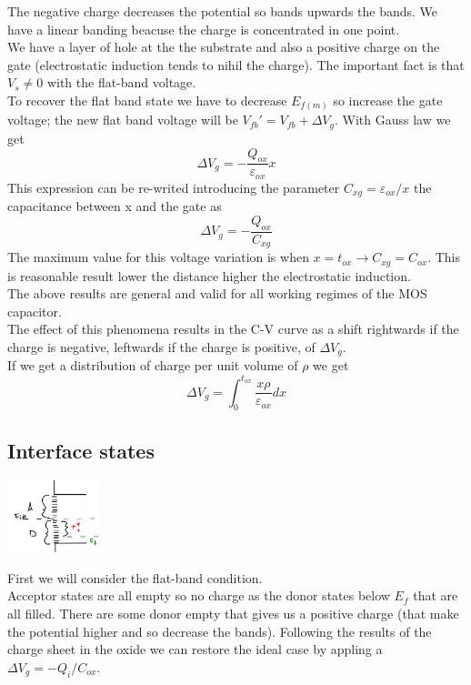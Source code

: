 The negative charge decreases the potential so bands upwards the bands. We have a linear banding beacuse the charge is concentrated in one point.\\
We have a layer of hole at the the substrate and also a positive charge on the gate (electrostatic induction tends to nihil the charge). The important fact is that $V_s\neq0$ with the flat-band voltage.\\
To recover the flat band state we have to decrease $E_{f(m)}$ so increase the gate voltage; the new flat band voltage will be $V_{fb}'=V_{fb}+\Delta V_g$. With Gauss law we get
\begin{equation}
\Delta V_g=-\frac{Q_{ox}}{\varepsilon_{ox}}x
\end{equation}
This expression can be re-writed introducing the parameter $C_{xg}=\varepsilon_{ox}/x$ the capacitance between x and the gate as
\begin{equation}
\Delta V_g=-\frac{Q_{ox}}{C_{xg}}
\end{equation}
The maximum value for this voltage variation is when $x=t_{ox}\rightarrow C_{xg}=C_{ox}$. This is reasonable result lower the distance higher the electrostatic induction.\\
The above results are general and valid for all working regimes of the MOS capacitor.\\
The effect of this phenomena results in the C-V curve as a shift rightwards if the charge is negative, leftwards if the charge is positive, of $\Delta V_g$.\\
If we get a distribution of charge per unit volume of $\rho$ we get 
\begin{equation}
\Delta V_g=\int_0^{t_{ox}}\frac{x\rho}{\varepsilon_{ox}}dx
\end{equation}

\subsection{Interface states}

\centering
\includegraphics[width=0.2\textwidth]{istafb.png}\\
\raggedright

First we will consider the flat-band condition.\\
Acceptor states are all empty so no charge as the donor states below $E_f$ that are all filled. There are some donor empty that gives us a positive charge (that make the potential higher and so decrease the bands). Following the results of the charge sheet in the oxide we can restore the ideal case by appling a $\Delta V_g= -Q_i/C_{ox}$.\\

